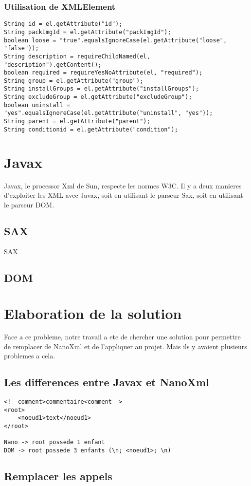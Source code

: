 \subsubsection{Utilisation de XMLElement}
\begin{verbatim}
String id = el.getAttribute("id");
String packImgId = el.getAttribute("packImgId");
boolean loose = "true".equalsIgnoreCase(el.getAttribute("loose", "false"));
String description = requireChildNamed(el, "description").getContent();
boolean required = requireYesNoAttribute(el, "required");
String group = el.getAttribute("group");
String installGroups = el.getAttribute("installGroups");
String excludeGroup = el.getAttribute("excludeGroup");
boolean uninstall = "yes".equalsIgnoreCase(el.getAttribute("uninstall", "yes"));
String parent = el.getAttribute("parent");
String conditionid = el.getAttribute("condition");
\end{verbatim}
\section{Javax}
Javax, le processor Xml de Sun, respecte les normes W3C. Il y a deux manieres d'exploiter les XML avec Javax, soit en utilisant le parseur Sax, soit en utilisant le parseur DOM.
\subsection{SAX}
SAX 
\subsection{DOM}
\section{Elaboration de la solution}
Face a ce probleme, notre travail a ete de chercher une solution pour permettre de remplacer de NanoXml et de l'appliquer au projet. Mais ils y avaient plusieurs problemes a cela.
\subsection{Les differences entre Javax et NanoXml}

\begin{verbatim}
<!--comment>commentaire<comment-->
<root>
	<noeud1>text</noeud1>
</root>

Nano -> root possede 1 enfant
DOM -> root possede 3 enfants (\n; <noeud1>; \n)
\end{verbatim}
\subsection{Remplacer les appels}
